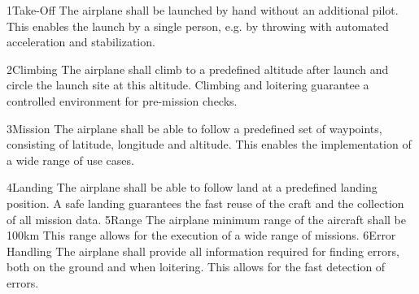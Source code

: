 \dd
    {1}{Take-Off}
    {
        The airplane shall be launched by hand without an additional pilot. 
    }
    {
        This enables the launch by a single person, e.g. by throwing
        with automated acceleration and stabilization.
    }

\dd
    {2}{Climbing}
    {
        The airplane shall climb to a predefined altitude after launch and
        circle the launch site at this altitude. 
    }
    {
        Climbing and loitering guarantee a controlled environment
        for pre-mission checks.
    }

\dd
    {3}{Mission}
    {
        The airplane shall be able to follow a predefined set of waypoints, consisting
        of latitude, longitude and altitude. 
    }
    {
        This enables the implementation of a wide range of use cases.
    }

\dd
    {4}{Landing}
    {
        The airplane shall be able to follow land at a predefined landing position.    
    }
    {
        A safe landing guarantees the fast reuse of the craft and the collection
        of all mission data.
    }
\dd
    {5}{Range}
    {
        The airplane minimum range of the aircraft shall be 100km
    }
    {
        This range allows for the execution of a wide range of missions.
    }
\dd
    {6}{Error Handling}
    {
        The airplane shall provide all information required for finding
        errors, both on the ground and when loitering.
    }
    {
        This allows for the fast detection of errors.
    }